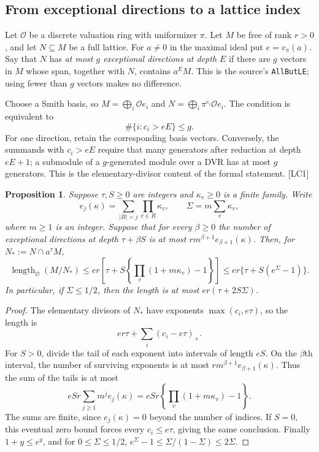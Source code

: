 \documentclass[11pt,a4paper]{article}
\numberwithin{equation}{section}
\newtheorem{proposition}[theorem]{Proposition}
\theoremstyle{remark}\newtheorem{remark}[theorem]{Remark}
\begin{document}
\subsection{From exceptional directions to a lattice index}

Let $\mathcal O$ be a discrete valuation ring with uniformizer $\pi$. Let $M$ be free of rank $r>0$, and let $N\subseteq M$ be a full lattice. For $a\ne0$ in the maximal ideal put $e=v_\pi(a)$. Say that $N$ has \emph{at most $g$ exceptional directions at depth $E$} if there are $g$ vectors in $M$ whose span, together with $N$, contains $a^E M$. This is the source's \texttt{AllButLE}; using fewer than $g$ vectors makes no difference.\cite{local-selection,local-smith}

Choose a Smith basis, so $M=\bigoplus_i\mathcal O e_i$ and $N=\bigoplus_i\pi^{c_i}\mathcal O e_i$. The condition is equivalent to
\[
\#\{i:c_i>eE\}\le g.
\]
For one direction, retain the corresponding basis vectors. Conversely, the summands with $c_i>eE$ require that many generators after reduction at depth $eE+1$; a submodule of a $g$-generated module over a DVR has at most $g$ generators. This is the elementary-divisor content of the formal statement. \textsf{[LC1]}

\begin{proposition}\label{prop:local-index}
Suppose $\tau,S\ge0$ are integers and $\kappa_v\ge0$ is a finite family. Write
\[
e_j(\kappa)=\sum_{|B|=j}\prod_{v\in B}\kappa_v,
\qquad \Sigma=m\sum_v\kappa_v,
\]
where $m\ge1$ is an integer. Suppose that for every $\beta\ge0$ the number of exceptional directions at depth $\tau+\beta S$ is at most
$r m^{\beta+1}e_{\beta+1}(\kappa)$. Then, for $N_*:=N\cap a^\tau M$,
\begin{equation}\label{eq:local-index-exact}
\operatorname{length}_{\mathcal O}(M/N_*)
\le er\left[\tau+S\left\{\prod_v(1+m\kappa_v)-1\right\}\right]
\le er\{\tau+S(e^\Sigma-1)\}.
\end{equation}
In particular, if $\Sigma\le1/2$, then the length is at most $er(\tau+2S\Sigma)$.
\end{proposition}

\begin{proof}
The elementary divisors of $N_*$ have exponents $\max(c_i,e\tau)$, so the length is
\[
er\tau+\sum_i(c_i-e\tau)_+.
\]
For $S>0$, divide the tail of each exponent into intervals of length $eS$. On the $\beta$th interval, the number of surviving exponents is at most $r m^{\beta+1}e_{\beta+1}(\kappa)$. Thus the sum of the tails is at most
\[
eSr\sum_{j\ge1}m^j e_j(\kappa)
=eSr\left\{\prod_v(1+m\kappa_v)-1\right\}.
\]
The sums are finite, since $e_j(\kappa)=0$ beyond the number of indices. If $S=0$, this eventual zero bound forces every $c_i\le e\tau$, giving the same conclusion. Finally $1+y\le e^y$, and for $0\le\Sigma\le1/2$,
$e^\Sigma-1\le\Sigma/(1-\Sigma)\le2\Sigma$.
\end{proof}
\end{document}
